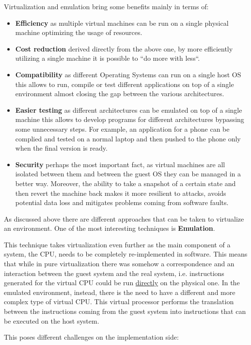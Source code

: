 Virtualization and emulation bring some benefits mainly in terms of:
\begin{itemize}
    \item \textbf{Efficiency} as multiple virtual machines can be run on a single physical machine optimizing the usage of resources.
    \item \textbf{Cost reduction} derived directly from the above one, by more efficiently utilizing a single machine it is possible to ``do more with less``.
    \item \textbf{Compatibility} as different Operating Systems can run on a single host OS this allows to run, compile or test different applications on top of a single environment almost closing the gap between the various architectures.
    \item \textbf{Easier testing} as different architectures can be emulated on top of a single machine this allows to develop programs for different architectures bypassing some unnecessary steps. For example, an application for a phone can be complied and tested on a normal laptop and then pushed to the phone only when the final version is ready.
    \item \textbf{Security} perhaps the most important fact, as virtual machines are all isolated between them and between the guest OS they can be managed in a better way. Moreover, the ability to take a snapshot of a certain state and then revert the machine back makes it more resilient to attacks, avoids potential data loss and mitigates problems coming from software faults. 
\end{itemize}

As discussed above there are different approaches that can be taken to virtualize an environment. One of the most interesting techniques is \textbf{Emulation}. 

This technique takes virtualization even further as the main component of a system, the CPU, needs to be completely re-implemented in software. This means that while in pure virtualization there was somehow a correspondence and an interaction between the guest system and the real system, i.e. instructions generated for the virtual CPU could be run \underline{directly} on the physical one. In the emulated environment, instead, there is the need to have a different and more complex type of virtual CPU. This virtual processor performs the translation between the instructions coming from the guest system into instructions that can be executed on the host system.

This poses different challenges on the implementation side: 

